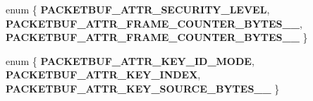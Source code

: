 \begin{DoxyCompactItemize}
\item 
\hypertarget{group__packetbuf_ga726ca809ffd3d67ab4b8476646f26635}{}enum \{ {\bfseries P\+A\+C\+K\+E\+T\+B\+U\+F\+\_\+\+A\+T\+T\+R\+\_\+\+S\+E\+C\+U\+R\+I\+T\+Y\+\_\+\+L\+E\+V\+E\+L}, 
{\bfseries P\+A\+C\+K\+E\+T\+B\+U\+F\+\_\+\+A\+T\+T\+R\+\_\+\+F\+R\+A\+M\+E\+\_\+\+C\+O\+U\+N\+T\+E\+R\+\_\+\+B\+Y\+T\+E\+S\+\_\+\_}, 
{\bfseries P\+A\+C\+K\+E\+T\+B\+U\+F\+\_\+\+A\+T\+T\+R\+\_\+\+F\+R\+A\+M\+E\+\_\+\+C\+O\+U\+N\+T\+E\+R\+\_\+\+B\+Y\+T\+E\+S\+\_\+\_}
 \}\label{group__packetbuf_ga726ca809ffd3d67ab4b8476646f26635}

\item 
\hypertarget{group__packetbuf_ga0411cd49bb5b71852cecd93bcbf0ca2d}{}enum \{ {\bfseries P\+A\+C\+K\+E\+T\+B\+U\+F\+\_\+\+A\+T\+T\+R\+\_\+\+K\+E\+Y\+\_\+\+I\+D\+\_\+\+M\+O\+D\+E}, 
{\bfseries P\+A\+C\+K\+E\+T\+B\+U\+F\+\_\+\+A\+T\+T\+R\+\_\+\+K\+E\+Y\+\_\+\+I\+N\+D\+E\+X}, 
{\bfseries P\+A\+C\+K\+E\+T\+B\+U\+F\+\_\+\+A\+T\+T\+R\+\_\+\+K\+E\+Y\+\_\+\+S\+O\+U\+R\+C\+E\+\_\+\+B\+Y\+T\+E\+S\+\_\+\_}
 \}\label{group__packetbuf_ga0411cd49bb5b71852cecd93bcbf0ca2d}

\end{DoxyCompactItemize}
